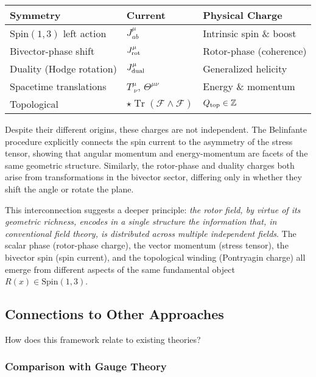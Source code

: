 \documentclass[11pt,a4paper]{article}
\numberwithin{equation}{section}
\theoremstyle{plain}
\theoremstyle{definition}
\theoremstyle{remark}
\DeclareMathOperator{\Tr}{Tr}
\begin{document}
\begin{center}
\renewcommand{\arraystretch}{1.3}
\begin{tabular}{@{}lll@{}}
\toprule
Symmetry & Current & Physical Charge \\
\midrule
$\mathrm{Spin}(1,3)$ left action & $J^\mu_{ab}$ & Intrinsic spin \& boost \\
Bivector-phase shift & $J^\mu_{\rm rot}$ & Rotor-phase (coherence) \\
Duality (Hodge rotation) & $J^\mu_{\rm dual}$ & Generalized helicity \\
Spacetime translations & $T^{\mu}_{\ \nu}$, $\Theta^{\mu\nu}$ & Energy \& momentum \\
Topological & $\star\Tr(\mathcal{F}\wedge\mathcal{F})$ & $Q_{\rm top}\in\mathbb{Z}$ \\
\bottomrule
\end{tabular}
\end{center}

Despite their different origins, these charges are not independent. The Belinfante procedure explicitly connects the spin current to the asymmetry of the stress tensor, showing that angular momentum and energy-momentum are facets of the same geometric structure. Similarly, the rotor-phase and duality charges both arise from transformations in the bivector sector, differing only in whether they shift the angle or rotate the plane.

This interconnection suggests a deeper principle: \emph{the rotor field, by virtue of its geometric richness, encodes in a single structure the information that, in conventional field theory, is distributed across multiple independent fields}. The scalar phase (rotor-phase charge), the vector momentum (stress tensor), the bivector spin (spin current), and the topological winding (Pontryagin charge) all emerge from different aspects of the same fundamental object $R(x) \in \mathrm{Spin}(1,3)$.

\subsection{Connections to Other Approaches}

How does this framework relate to existing theories?

\subsubsection{Comparison with Gauge Theory}
\end{document}
